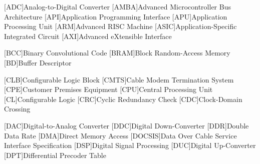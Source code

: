 
[ADC]{Analog-to-Digital Converter}
[AMBA]{Advanced Microcontroller Bus Architecture}
[API]{Application Programming Interface}
[APU]{Application Processing Unit}
[ARM]{Advanced RISC Machine}
[ASIC]{Application-Specific Integrated Circuit}
[AXI]{Advanced eXtensible Interface}

[BCC]{Binary Convolutional Code}
[BRAM]{Block Random-Access Memory}
[BD]{Buffer Descriptor}

[CLB]{Configurable Logic Block}
[CMTS]{Cable Modem Termination System}
[CPE]{Customer Premises Equipment}
[CPU]{Central Processing Unit}
[CL]{Configurable Logic}
[CRC]{Cyclic Redundancy Check}
[CDC]{Clock-Domain Crossing}

[DAC]{Digital-to-Analog Converter}
[DDC]{Digital Down-Converter}
[DDR]{Double Data Rate}
[DMA]{Direct Memory Access}
[DOCSIS]{Data Over Cable Service Interface Specification}
[DSP]{Digital Signal Processing}
[DUC]{Digital Up-Converter}
[DPT]{Differential Precoder Table}

